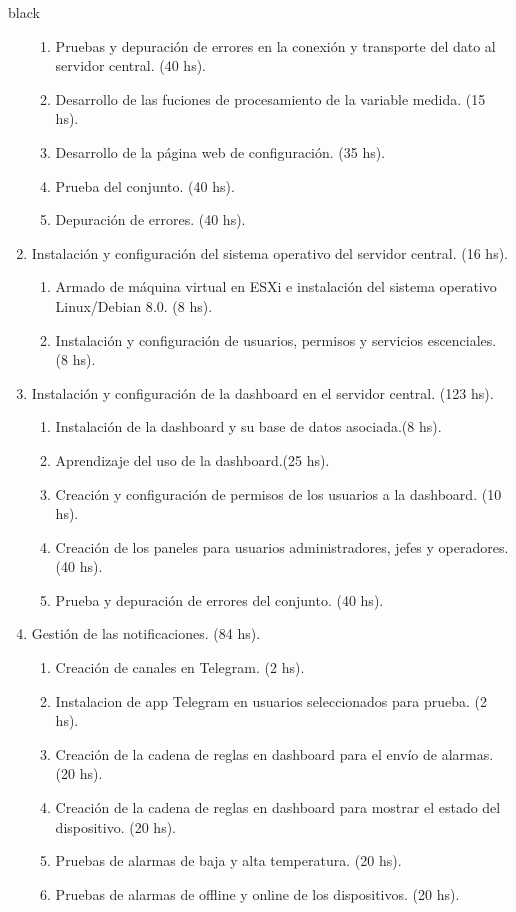 \documentclass[11pt]{charter}
\begin{document}
\begin{consigna}{black}
\begin{enumerate}
\begin{enumerate}
	\item Pruebas y depuración de errores en la conexión y transporte del dato al servidor central. (40 hs).
	\item Desarrollo de las fuciones de procesamiento de la variable medida. (15 hs).
	\item Desarrollo de la página web de configuración. (35 hs).
	\item Prueba del conjunto. (40 hs).
	\item Depuración de errores. (40 hs).
	\end{enumerate}
\item Instalación y configuración del sistema operativo del servidor central. (16 hs).
	\begin{enumerate}
	\item Armado de máquina virtual en ESXi e instalación del sistema operativo Linux/Debian 8.0.  (8 hs).
	\item Instalación y configuración de usuarios, permisos y servicios escenciales.  (8 hs).
	\end{enumerate}	
	
\item Instalación y configuración de la dashboard en el servidor central.  (123 hs).
	\begin{enumerate}
	\item Instalación de la dashboard y su base de datos asociada.(8 hs).
	\item Aprendizaje del uso de la dashboard.(25 hs).
	\item Creación y configuración de permisos de los usuarios a la dashboard. (10 hs).
	\item Creación de los paneles para usuarios administradores, jefes y operadores. (40 hs).
	\item Prueba y depuración de errores del conjunto. (40 hs).
	\end{enumerate}		
	
\item Gestión de las notificaciones. (84 hs).
	\begin{enumerate}
	\item Creación de canales en Telegram. (2 hs).
	\item Instalacion de app Telegram en usuarios seleccionados para prueba. (2 hs).
	\item Creación de la cadena de reglas en dashboard para el envío de alarmas. (20 hs).
	\item Creación de la cadena de reglas en dashboard para mostrar el estado del dispositivo. (20 hs).
	\item Pruebas de alarmas de baja y alta temperatura. (20 hs).
	\item Pruebas de alarmas de offline y online de los dispositivos. (20 hs).
	\end{enumerate}		


\end{enumerate}
\end{consigna}
\end{document}
